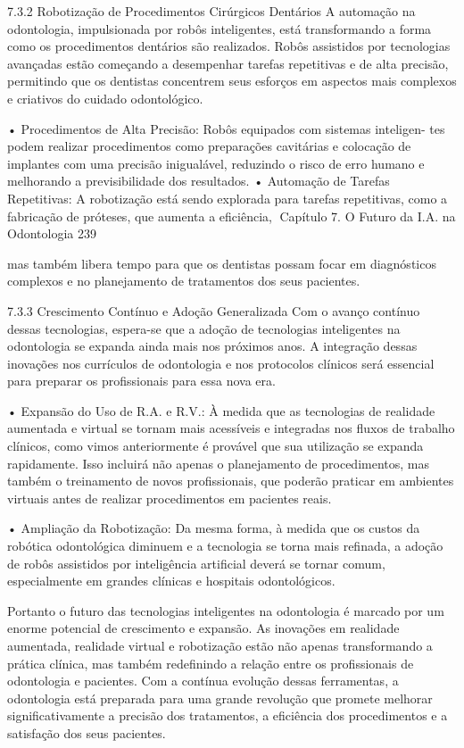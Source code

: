 7.3.2     Robotização de Procedimentos Cirúrgicos Dentários
A automação na odontologia, impulsionada por robôs inteligentes, está transformando
a forma como os procedimentos dentários são realizados. Robôs assistidos por
tecnologias avançadas estão começando a desempenhar tarefas repetitivas e de alta
precisão, permitindo que os dentistas concentrem seus esforços em aspectos mais
complexos e criativos do cuidado odontológico.

    • Procedimentos de Alta Precisão: Robôs equipados com sistemas inteligen-
      tes podem realizar procedimentos como preparações cavitárias e colocação de
      implantes com uma precisão inigualável, reduzindo o risco de erro humano e
      melhorando a previsibilidade dos resultados.
    • Automação de Tarefas Repetitivas: A robotização está sendo explorada para
      tarefas repetitivas, como a fabricação de próteses, que aumenta a eficiência,
Capítulo 7. O Futuro da I.A. na Odontologia                                            239


      mas também libera tempo para que os dentistas possam focar em diagnósticos
      complexos e no planejamento de tratamentos dos seus pacientes.

7.3.3     Crescimento Contínuo e Adoção Generalizada
Com o avanço contínuo dessas tecnologias, espera-se que a adoção de tecnologias
inteligentes na odontologia se expanda ainda mais nos próximos anos. A integração
dessas inovações nos currículos de odontologia e nos protocolos clínicos será essencial
para preparar os profissionais para essa nova era.

    • Expansão do Uso de R.A. e R.V.: À medida que as tecnologias de realidade
      aumentada e virtual se tornam mais acessíveis e integradas nos fluxos de trabalho
      clínicos, como vimos anteriormente é provável que sua utilização se expanda
      rapidamente. Isso incluirá não apenas o planejamento de procedimentos, mas
      também o treinamento de novos profissionais, que poderão praticar em ambientes
      virtuais antes de realizar procedimentos em pacientes reais.

    • Ampliação da Robotização: Da mesma forma, à medida que os custos da
      robótica odontológica diminuem e a tecnologia se torna mais refinada, a adoção de
      robôs assistidos por inteligência artificial deverá se tornar comum, especialmente
      em grandes clínicas e hospitais odontológicos.

         Portanto o futuro das tecnologias inteligentes na odontologia é marcado por um
enorme potencial de crescimento e expansão. As inovações em realidade aumentada,
realidade virtual e robotização estão não apenas transformando a prática clínica, mas
também redefinindo a relação entre os profissionais de odontologia e pacientes. Com
a contínua evolução dessas ferramentas, a odontologia está preparada para uma
grande revolução que promete melhorar significativamente a precisão dos tratamentos,
a eficiência dos procedimentos e a satisfação dos seus pacientes.


